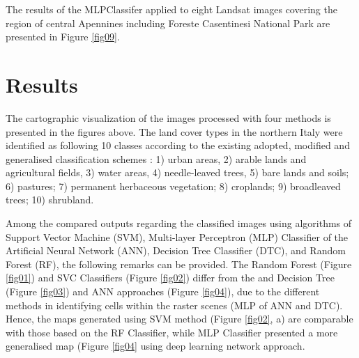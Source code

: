 \documentclass{elektr}
\begin{document}
The results of the MLPClassifer applied to eight Landsat images covering the region of central Apennines including Foreste Casentinesi National Park are presented in Figure \ref{fig09}.


\section{Results}

The cartographic visualization of the images processed with four methods is presented in the figures above. The land cover types in the northern Italy were identified as following 10 classes according to the existing adopted, modified and generalised classification schemes \cite{DeFioravante}: 1) urban areas, 2) arable lands and agricultural fields, 3) water areas, 4) needle-leaved trees, 5) bare lands and soils; 6) pastures; 7) permanent herbaceous vegetation; 8) croplands; 9) broadleaved trees; 10) shrubland. 

Among the compared outputs regarding the classified images using algorithms of Support Vector Machine (SVM), Multi-layer Perceptron (MLP) Classifier of the Artificial Neural Network (ANN), Decision Tree Classifier (DTC), and Random Forest (RF), the following remarks can be provided. The Random Forest (Figure \ref{fig01}) and SVC Classifiers (Figure \ref{fig02}) differ from the  and Decision Tree (Figure \ref{fig03}) and ANN approaches (Figure \ref{fig04}), due to the different methods in identifying cells within the raster scenes (MLP of ANN and DTC). Hence, the maps generated using SVM method (Figure \ref{fig02}, a) are comparable with those based on the RF Classifier, while MLP Classifier presented a more generalised map (Figure \ref{fig04} using deep learning network approach. 
\end{document}
